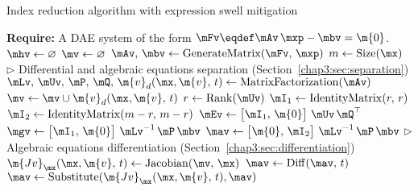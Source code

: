 \begin{breakablealgorithm}
  \caption{Index reduction algorithm with expression swell mitigation~}
  \label{chap3:alg:index_reduction}
  \begin{algorithmic}[1]
    \State \textbf{Require:} A \ac{DAE} system of the form $\mFv \eqdef \mAv \, \mxp - \mbv = \m{0}$.
     
      \State $\mhv \gets \varnothing$ 
      \State $\mv \gets \varnothing$ 
      \State $\mAv, \, \mbv \gets \mathrm{GenerateMatrix}(\mFv, \, \mxp)$ 
      \State $m \gets \mathrm{Size}(\mx)$
        \State $\displaystyle\triangleright$ Differential and algebraic equations separation (Section~\ref{chap3:sec:separation})
        \State $\mLv, \, \mUv, \, \mP, \, \mQ, \, \m{v}_d(\mx, \m{v}, \, t) \gets \mathrm{MatrixFactorization}(\mAv)$ 
        \State $\mv \gets \mv \cup \m{v}_d(\mx, \m{v}, \, t)$ 
        \State $r \gets \mathrm{Rank}(\mUv)$ 
        \State $\mI_1 \gets \mathrm{IdentityMatrix}(r, \, r)$ 
        \State $\mI_2 \gets \mathrm{IdentityMatrix}(m-r, \, m-r)$ 
        \State $\mEv \gets \begin{bmatrix} \mI_1, \, \m{0} \end{bmatrix} \, \mUv \, \mQ^\top$ 
        \State $\mgv \gets \begin{bmatrix} \mI_1, \, \m{0} \end{bmatrix} \, \mLv^{-1} \, \mP \, \mbv$ 
        \State $\mav \gets \begin{bmatrix} \m{0}, \, \mI_2 \end{bmatrix} \, \mLv^{-1} \, \mP \, \mbv$ 
        \State $\displaystyle\triangleright$ Algebraic equations differentiation (Section~\ref{chap3:sec:differentiation})
        \State $\m{Jv}_{\mx}(\mx, \m{v}, \, t) \gets \mathrm{Jacobian}(\mv, \, \mx)$ 
        \State $\mav \gets \mathrm{Diff}(\mav, \, t)$ 
        \State $\mav \gets \mathrm{Substitute}(\m{Jv}_{\mx}(\mx, \m{v}, \, t), \mav)$ 

\end{algorithmic}
\end{breakablealgorithm}
